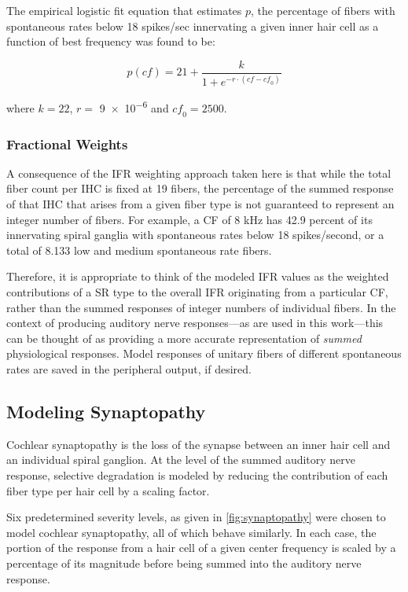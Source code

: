 The empirical logistic fit equation that estimates $p$, the percentage of fibers with spontaneous rates below 18 spikes/sec innervating a given inner hair cell as a function of best frequency was found to be: 

\begin{equation}
	p(\mathit{cf}) = 21 + \frac{k}{1+e^{-r\cdot(\mathit{cf}-\mathit{cf}_0)}}
\end{equation}

where $k = 22$, $r = $ \num{9e-6} and $\mathit{cf}_0 = 2500$.

\subsubsection{Fractional Weights}
A consequence of the IFR weighting approach taken here is that while the total fiber count per IHC is fixed at 19 fibers, the percentage of the summed response of that IHC that arises from a given fiber type is not guaranteed to represent an integer number of fibers.  For example, a CF of 8 kHz has 42.9 percent of its innervating spiral ganglia with spontaneous rates below 18 spikes/second, or a total of 8.133 low and medium spontaneous rate fibers.  

Therefore, it is appropriate to think of the modeled IFR values as the weighted contributions of a SR type to the overall IFR originating from a particular CF, rather than the summed responses of integer numbers of individual fibers.  In the context of producing auditory nerve responses---as are used in this work---this can be thought of as providing a more accurate representation of \emph{summed} physiological responses. Model responses of unitary fibers of different spontaneous rates are saved in the peripheral output, if desired.

\subsection{Modeling Synaptopathy} %
\label{sub:modeling_synaptopathy}
Cochlear synaptopathy is the loss of the synapse between an inner hair cell and an individual spiral ganglion.  At the level of the summed auditory nerve response, selective degradation is modeled by reducing the contribution of each fiber type per hair cell by a scaling factor. 

Six predetermined severity levels, as given in \autoref{fig:synaptopathy} were chosen to model cochlear synaptopathy, all of which behave similarly.  In each case, the portion of the response from a hair cell of a given center frequency is scaled by a percentage of its magnitude before being summed into the auditory nerve response.  

